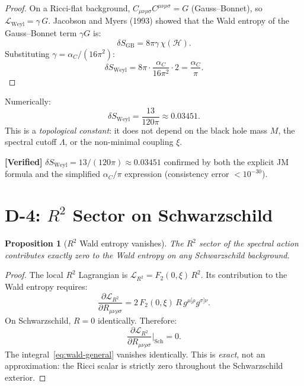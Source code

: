 \documentclass[11pt,a4paper]{article}
\newcommand{\Weylsq}{C_{\mu\nu\rho\sigma}C^{\mu\nu\rho\sigma}}
\theoremstyle{plain}
\newtheorem{proposition}[theorem]{Proposition}
\theoremstyle{definition}
\newcommand{\verified}[1]{%
  \par\smallskip\noindent
  \colorbox{green!10}{\parbox{\dimexpr\linewidth-2\fboxsep}{%
    \textcolor{green!50!black}{\textbf{[Verified]}} #1}}%
  \par\smallskip}
\begin{document}
\begin{proof}
On a Ricci-flat background, $\Weylsq = G$ (Gauss--Bonnet), so
$\mathcal{L}_{\mathrm{Weyl}} = \gamma\,G$.
Jacobson and Myers (1993) showed that the Wald entropy of the
Gauss--Bonnet term $\gamma G$ is:
\begin{equation}
  \delta S_{\mathrm{GB}} = 8\pi\gamma\,\chi(\mathcal{H}).
\end{equation}
Substituting $\gamma = \alpha_C/(16\pi^2)$:
\begin{equation}
  \delta S_{\mathrm{Weyl}} = 8\pi\cdot\frac{\alpha_C}{16\pi^2}\cdot 2
  = \frac{\alpha_C}{\pi}.
\end{equation}
\end{proof}

Numerically:
\begin{equation}
  \delta S_{\mathrm{Weyl}} = \frac{13}{120\pi} \approx 0.03451.
\end{equation}
This is a \emph{topological constant}: it does not depend on the black
hole mass $M$, the spectral cutoff $\Lambda$, or the non-minimal
coupling $\xi$.

\verified{$\delta S_{\mathrm{Weyl}} = 13/(120\pi) \approx 0.03451$
confirmed by both the explicit JM formula and the simplified
$\alpha_C/\pi$ expression (consistency error $< 10^{-30}$).}


\section{D-4: $R^2$ Sector on Schwarzschild}
\label{sec:D4}

\begin{proposition}[$R^2$ Wald entropy vanishes]\label{prop:R2-zero}
The $R^2$ sector of the spectral action contributes exactly zero
to the Wald entropy on any Schwarzschild background.
\end{proposition}

\begin{proof}
The local $R^2$ Lagrangian is $\mathcal{L}_{R^2} = F_2(0,\xi)\,R^2$.
Its contribution to the Wald entropy requires:
\begin{equation}
  \frac{\partial\mathcal{L}_{R^2}}{\partial R_{\mu\nu\rho\sigma}}
  = 2\,F_2(0,\xi)\,R\,g^{\mu[\rho}g^{\sigma]\nu}.
\end{equation}
On Schwarzschild, $R = 0$ identically. Therefore:
\begin{equation}
  \frac{\partial\mathcal{L}_{R^2}}{\partial R_{\mu\nu\rho\sigma}}
  \bigg|_{\mathrm{Sch}} = 0.
\end{equation}
The integral~\eqref{eq:wald-general} vanishes identically.
This is \emph{exact}, not an approximation: the Ricci scalar
is strictly zero throughout the Schwarzschild exterior.
\end{proof}
\end{document}
